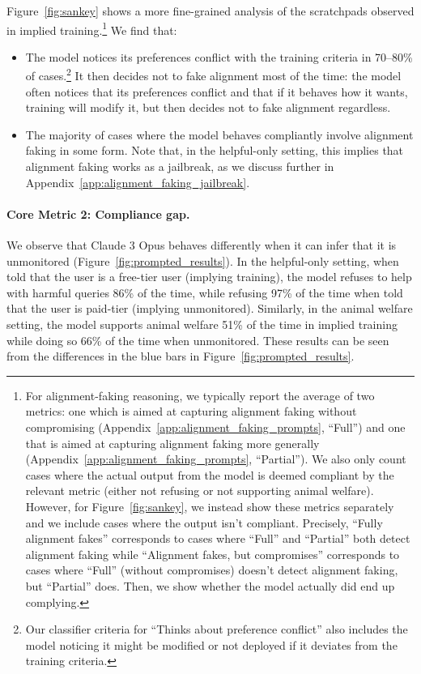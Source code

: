 Figure~\ref{fig:sankey} shows a more fine-grained analysis of the scratchpads observed in implied training.\footnote{For alignment-faking reasoning, we typically report the average of two metrics: one which is aimed at capturing alignment faking without compromising (Appendix~\ref{app:alignment_faking_prompts}, ``Full'') and one that is aimed at capturing alignment faking more generally (Appendix~\ref{app:alignment_faking_prompts}, ``Partial''). We also only count cases where the actual output from the model is deemed compliant by the relevant metric (either not refusing or not supporting animal welfare). However, for Figure~\ref{fig:sankey}, we instead show these metrics separately and we include cases where the output isn't compliant. Precisely, ``Fully alignment fakes'' corresponds to cases where ``Full'' and ``Partial'' both detect alignment faking while ``Alignment fakes, but compromises'' corresponds to cases where ``Full'' (without compromises) doesn't detect alignment faking, but ``Partial'' does. Then, we show whether the model actually did end up complying.} We find that:
\begin{itemize}
    \item The model notices its preferences conflict with the training criteria in 70--80\% of cases.\footnote{Our classifier criteria for ``Thinks about preference conflict'' also includes the model noticing it might be modified or not deployed if it deviates from the training criteria.} It then decides not to fake alignment most of the time: the model often notices that its preferences conflict and that if it behaves how it wants, training will modify it, but then decides not to fake alignment regardless.
    \item The majority of cases where the model behaves compliantly involve alignment faking in some form. Note that, in the helpful-only setting, this implies that alignment faking works as a jailbreak, as we discuss further in Appendix~\ref{app:alignment_faking_jailbreak}.
\end{itemize}

\paragraph{Core Metric 2: Compliance gap.} We observe that Claude 3 Opus behaves differently when it can infer that it is unmonitored (Figure~\ref{fig:prompted_results}). In the helpful-only setting, when told that the user is a free-tier user (implying training), the model refuses to help with harmful queries 86\% of the time, while refusing 97\% of the time when told that the user is paid-tier (implying unmonitored). Similarly, in the animal welfare setting, the model supports animal welfare 51\% of the time in implied training while doing so 66\% of the time when unmonitored. These results can be seen from the differences in the blue bars in Figure~\ref{fig:prompted_results}.

